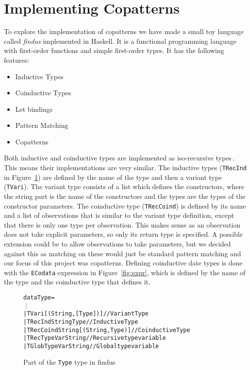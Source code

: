 \section{Implementing Copatterns}
\label{sec:implementing-copatterns}
To explore the implementation of copatterns we have made a small toy language called \textit{findus} implemented in Haskell. It is a functional programming language with first-order functions and simple first-order types. It has the following features:

\begin{itemize}
\item Inductive Types
\item Coinductive Types
\item Let bindings
\item Pattern Matching 
\item Copatterns
\end{itemize}

Both inductive and coinductive types are implemented as iso-recursive types\,\cite[p. 275]{Pierce:2002:TPL:509043}. This means their implementations are very similar. The inductive types (\texttt{TRecInd} in Figure~\ref{fig:types}) are defined by the name of the type and then a variant type (\texttt{TVari}). The variant type consists of a list which defines the constructors, where the string part is the name of the constructors and the types are the types of the constructor parameters. The coinductive type (\texttt{TRecCoind}) is defined by its name and a list of observations that is similar to the variant type definition, except that there is only one type per observation. This makes sense as an observation does not take explicit parameters, so only its return type is specified. A possible extension could be to allow observations to take parameters, but we decided against this as matching on these would just be standard pattern matching and our focus of this project was copatterns. Defining coinductive date types is done with the \texttt{ECodata} expression in Figure~\ref{fig:expr}, which is defined by the name of the type and the coinductive type that defines it.

\begin{figure}
\begin{alltt}
data Type =
  \vdots
  | TVari [(String, [Type])]          // Variant Type
  | TRecInd String Type               // Inductive Type
  | TRecCoind String [(String, Type)] // Coinductive Type
  | TRecTypeVar String                // Recursive type variable
  | TGlobTypeVar String               // Global type variable
\end{alltt}
\caption{Part of the \texttt{Type} type in findus}
\label{fig:types}
\end{figure}

